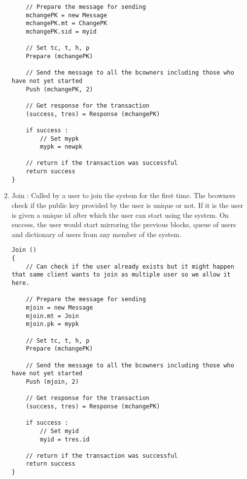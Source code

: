 \begin{enumerate}
\begin{lstlisting}
    // Prepare the message for sending
    mchangePK = new Message
    mchangePK.mt = ChangePK
    mchangePK.sid = myid
    
    // Set tc, t, h, p
    Prepare (mchangePK)

    // Send the message to all the bcowners including those who have not yet started
    Push (mchangePK, 2)

    // Get response for the transaction
    (success, tres) = Response (mchangePK)

    if success :
        // Set mypk
        mypk = newpk

    // return if the transaction was successful
    return success
}
    \end{lstlisting}
    \item Join : Called by a user to join the system for the first time. The bcowners check if the public key provided by the user is unique or not. If it is the user is given a unique id after which the user can start using the system. On success, the user would start mirroring the previous blocks, queue of users and dictionary of users from any member of the system.
    \begin{lstlisting}
Join ()
{
    // Can check if the user already exists but it might happen that same client wants to join as multiple user so we allow it here.

    // Prepare the message for sending
    mjoin = new Message
    mjoin.mt = Join
    mjoin.pk = mypk
    
    // Set tc, t, h, p
    Prepare (mchangePK)

    // Send the message to all the bcowners including those who have not yet started
    Push (mjoin, 2)

    // Get response for the transaction
    (success, tres) = Response (mchangePK)

    if success :
        // Set myid
        myid = tres.id

    // return if the transaction was successful
    return success
}
    \end{lstlisting} 
\end{enumerate}